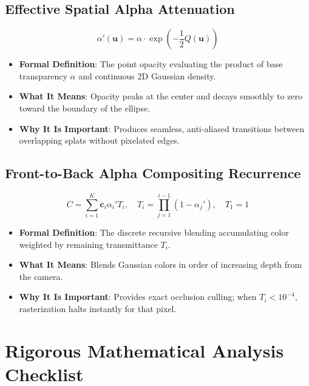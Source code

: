 \documentclass[11pt,a4paper]{article}
\theoremstyle{definition}
\begin{document}
\subsection{Effective Spatial Alpha Attenuation}
{\boldmath
\begin{equation}
\alpha'(\mathbf{u}) = \alpha \cdot \exp\left( -\frac{1}{2} Q(\mathbf{u}) \right)
\end{equation}
}
\begin{itemize}
    \item \textbf{Formal Definition}: The point opacity evaluating the product of base transparency $\alpha$ and continuous 2D Gaussian density.
    \item \textbf{What It Means}: Opacity peaks at the center and decays smoothly to zero toward the boundary of the ellipse.
    \item \textbf{Why It Is Important}: Produces seamless, anti-aliased transitions between overlapping splats without pixelated edges.
\end{itemize}

\subsection{Front-to-Back Alpha Compositing Recurrence}
{\boldmath
\begin{equation}
C = \sum_{i=1}^K \mathbf{c}_i \alpha_i' T_i, \quad T_i = \prod_{j=1}^{i-1} (1 - \alpha_j'), \quad T_1 = 1
\end{equation}
}
\begin{itemize}
    \item \textbf{Formal Definition}: The discrete recursive blending accumulating color weighted by remaining transmittance $T_i$.
    \item \textbf{What It Means}: Blends Gaussian colors in order of increasing depth from the camera.
    \item \textbf{Why It Is Important}: Provides exact occlusion culling; when $T_i < 10^{-4}$, rasterization halts instantly for that pixel.
\end{itemize}

\section{Rigorous Mathematical Analysis Checklist}
\end{document}
